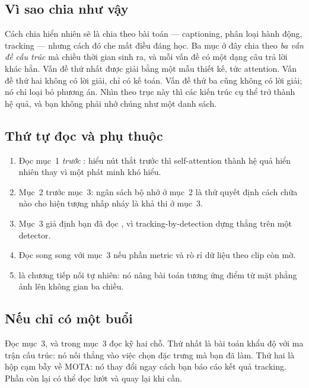 \documentclass[../../deep_learning.tex]{subfiles}
\begin{document}
\subsection*{Vì sao chia như vậy}
Cách chia hiển nhiên sẽ là chia theo bài toán --- captioning, phân loại hành động, tracking --- nhưng cách đó che mất điều đáng học. Ba mục ở đây chia theo \emph{ba vấn đề cấu trúc} mà chiều thời gian sinh ra, và mỗi vấn đề có một dạng câu trả lời khác hẳn. Vấn đề thứ nhất được giải bằng một mẫu thiết kế, tức attention. Vấn đề thứ hai không có lời giải, chỉ có kế toán. Vấn đề thứ ba cũng không có lời giải; nó chỉ loại bỏ phương án. Nhìn theo trục này thì các kiến trúc cụ thể trở thành hệ quả, và bạn không phải nhớ chúng như một danh sách.

\subsection*{Thứ tự đọc và phụ thuộc}
\begin{enumerate}
\item Đọc mục~1 \emph{trước} : hiểu nút thắt trước thì self-attention thành hệ quả hiển nhiên thay vì một phát minh khó hiểu.
\item Mục~2 trước mục~3: ngân sách bộ nhớ ở mục~2 là thứ quyết định cách chữa nào cho hiện tượng nhấp nháy là khả thi ở mục~3.
\item Mục~3 giả định bạn đã đọc , vì tracking-by-detection dựng thẳng trên một detector.
\item Đọc  song song với mục~3 nếu phần metric và rò rỉ dữ liệu theo clip còn mờ.
\item {} là chương tiếp nối tự nhiên: nó nâng bài toán tương ứng điểm từ mặt phẳng ảnh lên không gian ba chiều.
\end{enumerate}

\subsection*{Nếu chỉ có một buổi}
Đọc mục~3, và trong mục~3 đọc kỹ hai chỗ. Thứ nhất là bài toán khẩu độ với ma trận cấu trúc: nó nối thẳng vào việc chọn đặc trưng mà bạn đã làm. Thứ hai là hộp cạm bẫy về MOTA: nó thay đổi ngay cách bạn báo cáo kết quả tracking. Phần còn lại có thể đọc lướt và quay lại khi cần.
\end{document}
